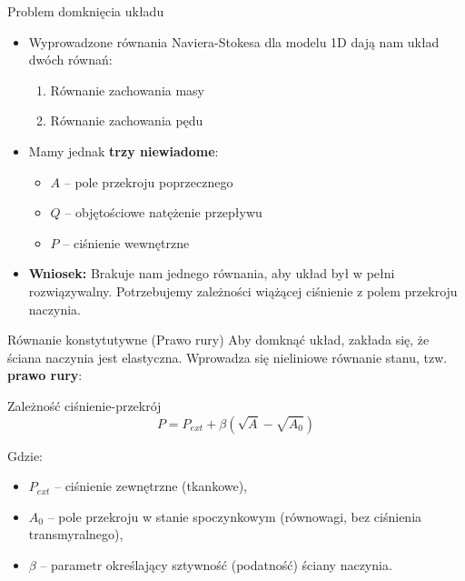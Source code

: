\documentclass[aspectratio=169]{beamer}
\begin{document}
\begin{frame}{Problem domknięcia układu}
    \begin{itemize}
        \item Wyprowadzone równania Naviera-Stokesa dla modelu 1D dają nam układ dwóch równań:
        \begin{enumerate}
            \item Równanie zachowania masy
            \item Równanie zachowania pędu
        \end{enumerate}
        \item Mamy jednak \textbf{trzy niewiadome}:
        \begin{itemize}
            \item $A$ -- pole przekroju poprzecznego
            \item $Q$ -- objętościowe natężenie przepływu
            \item $P$ -- ciśnienie wewnętrzne
        \end{itemize}
        \item \textbf{Wniosek:} Brakuje nam jednego równania, aby układ był w pełni rozwiązywalny. Potrzebujemy zależności wiążącej ciśnienie z polem przekroju naczynia.
    \end{itemize}
\end{frame}

\begin{frame}{Równanie konstytutywne (Prawo rury)}
    Aby domknąć układ, zakłada się, że ściana naczynia jest elastyczna. Wprowadza się nieliniowe równanie stanu, tzw. \textbf{prawo rury}:
    \begin{block}{Zależność ciśnienie-przekrój}
        $$P = P_{ext} + \beta(\sqrt{A} - \sqrt{A_0})$$
    \end{block}
    \vspace{0.3cm}
    Gdzie:
    \begin{itemize}
        \item $P_{ext}$ -- ciśnienie zewnętrzne (tkankowe),
        \item $A_0$ -- pole przekroju w stanie spoczynkowym (równowagi, bez ciśnienia transmyralnego),
        \item $\beta$ -- parametr określający sztywność (podatność) ściany naczynia.
    \end{itemize}
\end{frame}
\end{document}
